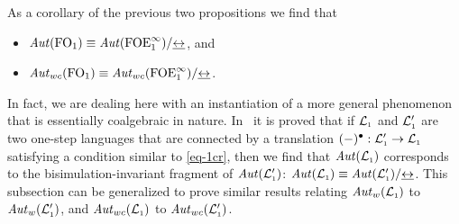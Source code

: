 \begin{remark}{\rm
As a corollary of the previous two propositions we find that 
\begin{itemize}
	 pt
	\item $\Aut(\ofo) \equiv \Aut(\olque)/{\bis}$, and
	\item $\AutWC(\ofo) \equiv \AutWC(\olque)/{\bis}$.
\end{itemize}
In fact, we are dealing here with an instantiation of a more general phenomenon 
that is essentially coalgebraic in nature.
In~\cite{Venxx} it is proved that if $\llang$ and $\llang'$ are two one-step
languages that are connected by a translation $(-)^{\bullet}: \llang' \to 
\llang$ satisfying a condition similar to \eqref{eq-1cr}, then we find that 
$\Aut(\llang)$ corresponds to the bisimulation-invariant fragment of 
$\Aut(\llang')$: $\Aut(\llang) \equiv \Aut(\llang')/{\bis}$.
This subsection can be generalized to prove similar results relating
$\AutW(\llang)$ to $\AutW(\llang')$, and $\AutWC(\llang)$ to 
$\AutWC(\llang')$.
}\end{remark}
